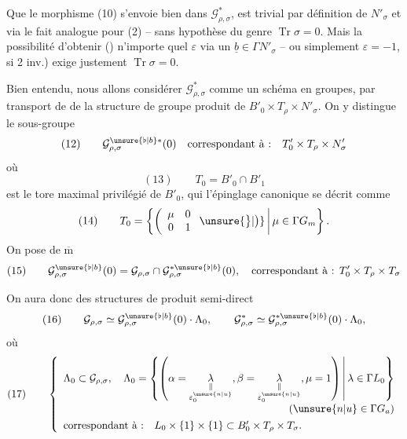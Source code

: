 
Que le morphisme (10) s'envoie bien dans $\mathcal G_{\rho,\sigma}^{*}$,
est trivial par définition de $N'_\sigma$ et via le fait analogue pour (2)
-- sans hypothèse du genre $\operatorname{Tr}\sigma=0$.
Mais la possibilité d'obtenir ()
n'importe quel $\varepsilon$ via un $\underline b\in\Gamma N'_\sigma$
-- ou simplement $\varepsilon=-1$, si 2 inv.) exige justement
$\operatorname{Tr}\sigma=0$.

Bien entendu, nous allons considérer $\mathcal G_{\rho,\sigma}^{*}$ comme un schéma en groupes,
par transport de  de la structure de groupe produit de
$B'_0\times T_\rho\times N'_\sigma$.
On y distingue le sous-groupe
\[
(12)\qquad \mathcal G_{\rho,\sigma}^{\unsure{\flat|b}*}(0)
\quad\text{correspondant à :}\quad T'_0\times T_\rho\times N'_\sigma
\]
où
\[
(13)\qquad T_0=B'_0\cap B'_1
\]
est le tore maximal privilégié de $B'_0$, qui
 l'épinglage canonique se décrit comme
\[
(14)\qquad T_0=\left\{\left(\begin{array}{cc}\mu&0\\0&1\end{array}\right.\unsure{\big\}|\big)}
\,\middle|\,\mu\in\Gamma\mathbb \mathbb G_m\right\}.
\]
On pose de $\overline{\mathrm m}$
\[
(15)\qquad \mathcal G_{\rho,\sigma}^{\unsure{\flat|b}}(0)
=\mathcal G_{\rho,\sigma}\cap\mathcal G_{\rho,\sigma}^{*\unsure{\flat|b}}(0),
\quad\text{correspondant à : }T'_0\times T_\rho\times T_\sigma
\]




On aura donc des structures de produit semi-direct
\[
(16)\qquad
\mathcal G_{\rho,\sigma}\simeq
\mathcal G_{\rho,\sigma}^{\unsure{\flat|b}}(0)\cdot\Lambda_0,
\qquad
\mathcal G_{\rho,\sigma}^{*}\simeq
\mathcal G_{\rho,\sigma}^{*\unsure{\flat|b}}(0)\cdot\Lambda_0,
\]
où
\[
(17)\qquad
\left\{\begin{array}{l}
\displaystyle\Lambda_0\subset\mathcal G_{\rho,\sigma},\quad
\Lambda_0=\left\{\left(
\alpha=\underset{\substack{\Vert\\\varepsilon_0^{\unsure{n|u}}}}{\lambda},
\beta=\underset{\substack{\Vert\\\varepsilon_0^{\unsure{n|u}}}}{\lambda},
\mu=1\right)\,\middle|\,\lambda\in\Gamma L_0\right\}\\
\hfill(\unsure{n|u}\in\Gamma\mathbb \mathbb G_a)\\[4pt]
\text{correspondant à :}\quad L_0\times\{1\}\times\{1\}
\subset B'_0\times T_\rho\times T_\sigma.
\end{array}\right.
\]

